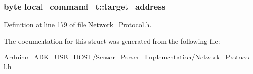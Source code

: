 \hypertarget{structlocal__command__t_ab656f0ed36cf31ffb9197747d0f8a640}{
\subsubsection[{target\-\_\-address}]{\setlength{\rightskip}{0pt plus 5cm}byte local\-\_\-command\-\_\-t\-::target\-\_\-address}}\label{structlocal__command__t_ab656f0ed36cf31ffb9197747d0f8a640}


Definition at line 179 of file Network\-\_\-\-Protocol.\-h.



The documentation for this struct was generated from the following file\-:\begin{DoxyCompactItemize}
\item 
Arduino\-\_\-\-A\-D\-K\-\_\-\-U\-S\-B\-\_\-\-H\-O\-S\-T/\-Sensor\-\_\-\-Parser\-\_\-\-Implementation/\hyperlink{_network___protocol_8h}{Network\-\_\-\-Protocol.\-h}\end{DoxyCompactItemize}
